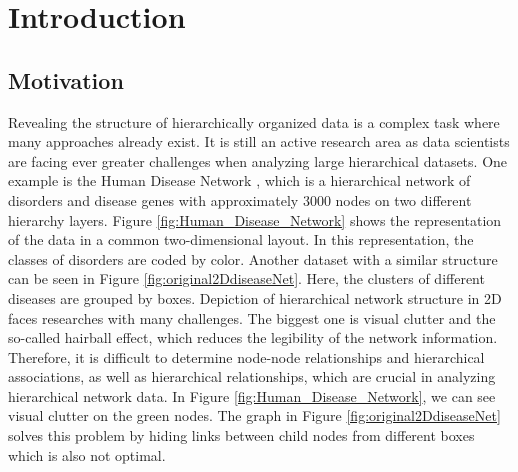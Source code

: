 \chapter{Introduction}

\section{Motivation}
\label{sec:motivation}
Revealing the structure of hierarchically organized data is a complex task where many approaches already exist. It is still an active research area as data scientists are facing ever greater challenges when analyzing large hierarchical datasets. One example is the Human Disease Network \cite{zhou_human_2014}, which is a hierarchical network of disorders and disease genes with approximately 3000 nodes on two different hierarchy layers. Figure \ref{fig:Human_Disease_Network} shows the representation of the data in a common two-dimensional layout. In this representation, the classes of disorders are coded by color. 
Another dataset with a similar structure can be seen in Figure \ref{fig:original2DdiseaseNet}. Here, the clusters of different diseases are grouped by boxes. 
Depiction of hierarchical network structure in 2D faces researches with many challenges. The biggest one is visual clutter and the so-called hairball effect, which reduces the legibility of the network information. Therefore, it is difficult to determine node-node relationships and hierarchical associations, as well as hierarchical relationships, which are crucial in analyzing hierarchical network data. In Figure \ref{fig:Human_Disease_Network}, we can see visual clutter on the green nodes. The graph in Figure \ref{fig:original2DdiseaseNet} solves this problem by hiding links between child nodes from different boxes which is also not optimal.

